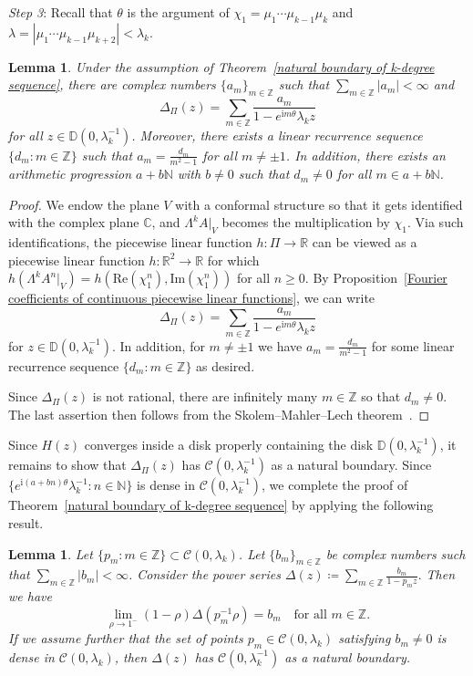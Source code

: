 \documentclass[11pt,a4paper]{article}
\theoremstyle{plain}
\newtheorem{lemma}[theorem]{Lemma}
\theoremstyle{remark}
\theoremstyle{custombold}
\newcommand{\irm}{\mathrm{i}}
\begin{document}
\medskip
\noindent
\emph{Step 3}: Recall that $\theta$ is the argument of $\chi_1=\mu_1\cdots\mu_{k-1}\mu_{k}$ and $\lambda=|\mu_1\cdots\mu_{k-1}\mu_{k+2}|<\lambda_k$.
\begin{lemma}\label{an expression of Delta}
Under the assumption of Theorem~\ref{natural boundary of k-degree sequence}, there are complex numbers $\{a_m\}_{m\in\mathbb Z}$ such that $\sum_{m\in\mathbb Z}|a_{m}|<\infty$ and
     $$\Delta_{\Pi}(z)=\sum_{m\in\mathbb Z}\frac{a_{m}}{1-e^{\irm m\theta}\lambda_kz}$$ for all  $z\in\mathbb D(0,\lambda_k^{-1})$. Moreover, there exists a linear recurrence sequence $\{d_{m}:m\in\mathbb Z\}$ such that $a_{m}=\frac{d_{m}}{m^2-1}$ for all $m\neq\pm1$. In addition, there exists an arithmetic progression $a+b\mathbb N$ with $b\neq0$ such that $d_m\neq0$ for all $m \in a+b\mathbb N$.  
\end{lemma}
\begin{proof}
We endow the plane $V$ with a conformal structure so that
it gets identified with the complex plane $\mathbb C$, and $\Lambda^k A|_V$ becomes the multiplication
by $\chi_1$. Via such identifications, the piecewise linear function $h:\Pi\rightarrow \mathbb R$ can be viewed as a piecewise linear function $h\colon\mathbb R^2\rightarrow\mathbb R$ for which $h(\Lambda^k A^n|_V)=h(\mathrm{Re}(\chi_1^n),\mathrm{Im}(\chi_1^n))$ for all $n\geq0$. By Proposition~\ref{Fourier coefficients of continuous piecewise linear functions}, we can write
$$\Delta_{\Pi}(z)=\sum_{m\in\mathbb Z}\frac{a_m}{1-e^
    {\irm m\theta}\lambda_kz}$$ for $z\in\mathbb D(0,\lambda_k^{-1})$. In addition, for $m\neq\pm1$ we have  $a_m=\frac{d_m}{m^2-1}$  for some linear recurrence sequence $\{d_m:m\in\mathbb Z\}$ as desired.   

    Since $\Delta_\Pi(z)$ is not rational, there are infinitely many $m\in\mathbb Z$ so that $d_m\neq0$. The last assertion then follows from the Skolem--Mahler--Lech  theorem~\cite[Chapter~4 Exercise 4]{Stanley-Enumerative-Combinatorics-2011}.
\end{proof}
Since $H(z)$ converges inside a disk properly containing the disk $\mathbb D(0,\lambda_k^{-1})$, it remains to show that $\Delta_\Pi(z)$ has 
$\mathcal{C}(0,\lambda_k^{-1})$ as a natural boundary. Since $\{e^{\irm (a+bn)\theta}\lambda_k^{-1}:n\in\mathbb N\}$ is dense in $\mathcal{C}(0,\lambda_k^{-1})$, we complete the proof of Theorem~\ref{natural boundary of k-degree sequence} by applying the following result.

\begin{lemma}\label{A general result on natural boundary}
    Let $\{p_m:m\in \mathbb{Z}\}\subset\mathcal C(0,\lambda_k)$. Let  $\{b_{m}\}_{m\in\mathbb Z}$ be complex numbers such that $\sum_{m\in \mathbb Z}|b_{m}|<\infty$. Consider the power series $\Delta(z)\coloneqq \sum_{m\in \mathbb{Z}}\frac{b_{m}}{1-p_mz}.$  Then we have  $$\lim_{\rho\to1^{-}}(1-\rho)\Delta(p_m^{-1}\rho)=b_{m}\text{ }\text{ for all }m\in\mathbb Z.$$
    If we assume further that the set of points $p_m\in\mathcal{C}(0,\lambda_k)$ satisfying $b_m\neq0$ is dense in $\mathcal{C}(0,\lambda_k)$, then $\Delta(z)$ has $\mathcal{C}(0,\lambda_k^{-1})$ as a natural boundary.
\end{lemma}
\end{document}
